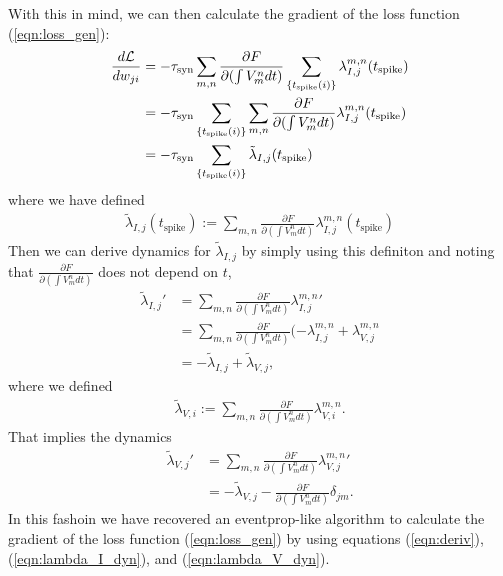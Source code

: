 \documentclass[a4paper]{article}
\begin{document}
  With this in mind, we can then calculate the gradient of the loss function (\ref{eqn:loss_gen}):
  \begin{align}
    \frac{d {\cal L}}{d w_{ji}} &= -\tau_{\text{syn}} \sum_{m,n} \frac{\partial F}{\partial (\int V_m^n dt)} \sum_{\{t_{\text{spike}}(i)\}} \lambda_{I,j}^{m,n}(t_{\text{spike}}) \\
      &= -\tau_{\text{syn}} \sum_{\{t_{\text{spike}}(i)\}} \sum_{m,n} \frac{\partial F}{\partial (\int V_m^n dt)}  \lambda_{I,j}^{m,n}(t_{\text{spike}}) \\
        &= -\tau_{\text{syn}} \sum_{\{t_{\text{spike}}(i)\}} \tilde{\lambda}_{I,j} (t_{\text{spike}}) \label{eqn:deriv}
  \end{align}
  where we have defined
  \begin{align}
    \tilde{\lambda}_{I,j} (t_{\text{spike}}):= \sum_{m,n} \frac{\partial F}{\partial (\int V_m^n dt)}  \lambda_{I,j}^{m,n}(t_{\text{spike}})
  \end{align}
  Then we can derive dynamics for $\tilde{\lambda}_{I,j}$ by simply using this definiton and noting that $\frac{\partial F}{\partial (\int V_m^n dt)}$ does not depend on $t$,
  \begin{align}
    \tilde{\lambda}_{I,j}' &= \sum_{m,n} \frac{\partial F}{\partial (\int V_m^n dt)}  {\lambda_{I,j}^{m,n}}' \\
    &= \sum_{m,n} \frac{\partial F}{\partial (\int V_m^n dt)} (-  \lambda_{I,j}^{m,n} +  \lambda_{V,j}^{m,n} \\
    &= -\tilde{\lambda}_{I,j} + \tilde{\lambda}_{V,j}, \label{eqn:lambda_I_dyn}
  \end{align}
  where we defined
  \begin{align}
    \tilde{\lambda}_{V,i}:= \sum_{m,n} \frac{\partial F}{\partial (\int V_m^n dt)} \lambda_{V,i}^{m,n}.
  \end{align}
  That implies the dynamics
  \begin{align}
    \tilde{\lambda}_{V,j}' &=  \sum_{m,n} \frac{\partial F}{\partial (\int V_m^n dt)} {\lambda_{V,j}^{m,n}}' \\
    &= - \tilde{\lambda}_{V,j} - \frac{\partial F}{\partial (\int V_m^n dt)} \delta_{jm}.\label{eqn:lambda_V_dyn}
  \end{align}
  In this fashoin we have recovered an eventprop-like algorithm to calculate the gradient of the loss function (\ref{eqn:loss_gen}) by using equations (\ref{eqn:deriv}),(\ref{eqn:lambda_I_dyn}), and (\ref{eqn:lambda_V_dyn}).
\end{document}
